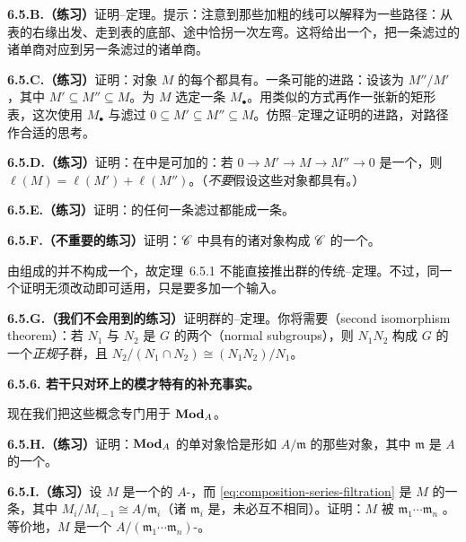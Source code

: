 \textbf{6.5.B.（练习）}\quad 证明\trJordan--\trHolder{}定理。提示：注意到那些加粗的线可以解释为一些路径：从表的右缘出发、走到表的底部、途中恰拐一次左弯。这将给出一个\trBijection，把一条滤过的诸单商对应到另一条滤过的诸单商。

\textbf{6.5.C.（练习）}\quad 证明：\trFiniteLength{}对象 $M$ 的每个\trSubquotient{}都具有\trFiniteLength{}。一条可能的进路：设该\trSubquotient{}为 $M''/M'$，其中 $M'\subseteq M''\subseteq M$。为 $M$ 选定一条\trCompositionSeries{} $M_\bullet$。用类似的方式再作一张新的矩形表，这次使用\trCompositionSeries{} $M_\bullet$ 与滤过 $0\subseteq M'\subseteq M''\subseteq M$。仿照\trJordan--\trHolder{}定理之证明的进路，对路径作合适的思考。

\textbf{6.5.D.（练习）}\quad 证明：\trLength{}在\trExactSequence{}中是可加的：若 $0\to M'\to M\to M''\to 0$ 是一个\trExactSequence，则 $\ell(M)=\ell(M')+\ell(M'')$。（\emph{不要}假设这些对象都具有\trFiniteLength{}。）

\textbf{6.5.E.（练习）}\quad 证明：\trFiniteLength{}\trModule{}的任何一条滤过都能\trRefine{}成一条\trCompositionSeries{}。

\textbf{6.5.F.（不重要的练习）}\quad 证明：$\mathscr{C}$ 中具有\trFiniteLength{}的诸对象构成 $\mathscr{C}$ 的一个\trFullSubcategory。

由\trGroup{}组成的\trCategory{}并不构成一个\trAbelianCategory，故定理~6.5.1 不能直接推出群的传统\trJordan--\trHolder{}定理。不过，同一个证明无须改动即可适用，只是要多加一个输入。

\textbf{6.5.G.（我们不会用到的练习）}\quad 证明群的\trJordan--\trHolder{}定理。你将需要\trSecondIsomorphismTheorem{}（second isomorphism theorem）：若 $N_1$ 与 $N_2$ 是\trGroup{} $G$ 的两个\trNormalSubgroup{}（normal subgroups），则 $N_1N_2$ 构成 $G$ 的一个\emph{正规}子群，且 $N_2/(N_1\cap N_2)\cong(N_1N_2)/N_1$。

\textbf{6.5.6. 若干只对环上的模才特有的补充事实。}

现在我们把这些概念专门用于\trCategory{} $\mathbf{Mod}_{A}$。

\textbf{6.5.H.（练习）}\quad 证明：$\mathbf{Mod}_{A}$ 的单对象恰是形如 $A/\mathfrak{m}$ 的那些对象，其中 $\mathfrak{m}$ 是 $A$ 的一个\trMaximalIdeal。

\textbf{6.5.I.（练习）}\quad 设 $M$ 是一个\trFiniteLength{}的 $A$-\trModule，而 \eqref{eq:composition-series-filtration} 是 $M$ 的一条\trCompositionSeries{}，其中 $M_i/M_{i-1}\cong A/\mathfrak{m}_i$（诸 $\mathfrak{m}_i$ 是\trMaximalIdeal，未必互不相同）。证明：$M$ 被 $\mathfrak{m}_1\cdots\mathfrak{m}_n$ \trAnnihilate{}。等价地，$M$ 是一个 $A/(\mathfrak{m}_1\cdots\mathfrak{m}_n)$-\trModule。

